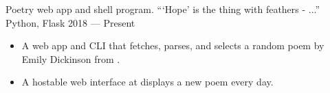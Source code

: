 \showoff
{}
{Poetry web app and shell program. ```Hope' is the thing with feathers - ...''}
{Python, Flask}
{2018 --- Present}

\begin{itemize}[label=$\triangleright$]
    \item A web app and CLI that fetches, parses, and selects a random poem by Emily Dickinson from .
    \item A hostable web interface at  displays a new poem every day.
\end{itemize}
